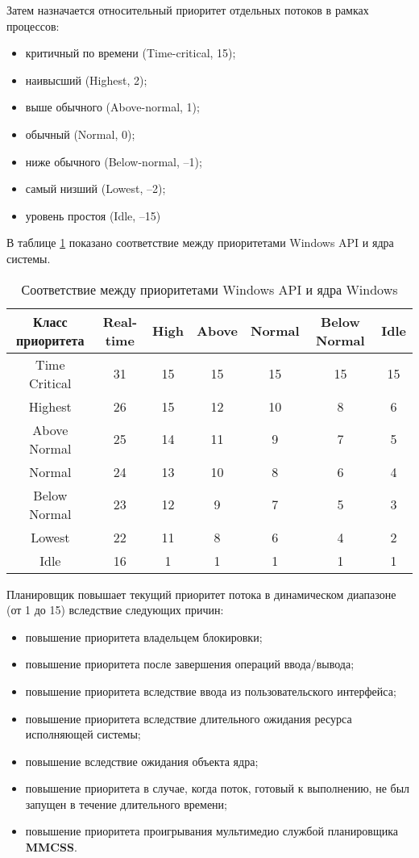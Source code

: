 Затем назначается относительный приоритет отдельных потоков в рамках процессов:
\begin{itemize}
	\item критичный по времени (Time-critical, 15);
	\item наивысший (Highest, 2);
	\item выше обычного (Above-normal, 1);
	\item обычный (Normal, 0);
	\item ниже обычного (Below-normal, –1);
	\item самый низший (Lowest, –2);
	\item уровень простоя (Idle, –15)
\end{itemize}

В таблице \ref{tab:prioritet} показано соответствие между приоритетами Windows API и ядра системы.

\begin{table}[!h]
	\caption{Соответствие между приоритетами Windows API и ядра Windows}
	\begin{center}
		\begin{tabular}{|c|c|c|c|c|c|c|}
			\hline
			Класс приоритета & Real-time & High & Above &
			Normal & Below Normal & Idle \\ \hline
			Time Critical & 31 & 15 & 15 & 15 & 15 & 15 \\ \hline
			Highest & 26 & 15 & 12 & 10 & 8 & 6 \\ \hline
			Above Normal & 25 & 14 & 11 & 9 & 7 & 5 \\ \hline
			Normal & 24 & 13 & 10 & 8 & 6 & 4 \\ \hline
			Below Normal & 23 & 12 & 9 & 7 & 5 & 3 \\ \hline
			Lowest & 22 & 11 & 8 & 6 & 4 & 2 \\ \hline
			Idle & 16 & 1 & 1 & 1 & 1 & 1 \\ \hline
		\end{tabular}
	\end{center}
	\label{tab:prioritet}
\end{table}

Планировщик повышает текущий приоритет потока в динамическом диапазоне (от 1 до 15) вследствие следующих причин:
\begin{itemize}
	\item повышение приоритета владельцем блокировки;
	\item повышение приоритета после завершения операций ввода/вывода;
	\item повышение приоритета вследствие ввода из пользовательского интерфейса;
	\item повышение приоритета вследствие длительного ожидания ресурса исполняющей системы;
	\item повышение вследствие ожидания объекта ядра;
	\item повышение приоритета в случае, когда поток, готовый к выполнению, не был запущен в течение длительного времени;
	\item повышение приоритета проигрывания мультимедио службой планировщика \textbf{MMCSS}.
\end{itemize}

